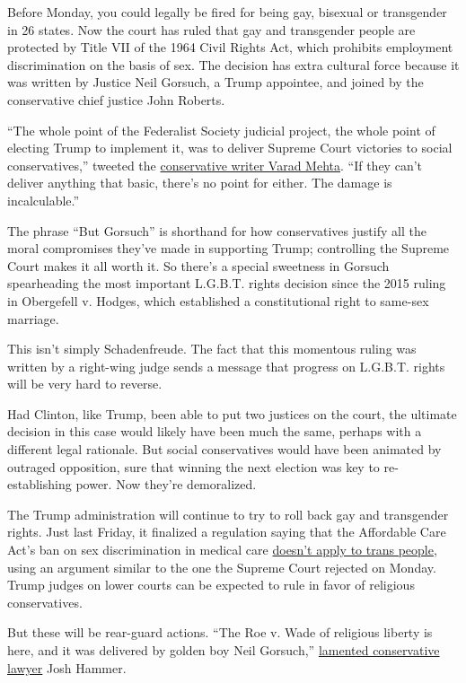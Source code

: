 Before Monday, you could legally be fired for being gay, bisexual or
transgender in 26 states. Now the court has ruled that gay and
transgender people are protected by Title VII of the 1964 Civil Rights
Act, which prohibits employment discrimination on the basis of sex. The
decision has extra cultural force because it was written by Justice Neil
Gorsuch, a Trump appointee, and joined by the conservative chief justice
John Roberts.

``The whole point of the Federalist Society judicial project, the whole
point of electing Trump to implement it, was to deliver Supreme Court
victories to social conservatives,'' tweeted the
\href{https://twitter.com/varadmehta/status/1272532015292862464?s=20}{conservative
writer Varad Mehta}. ``If they can't deliver anything that basic,
there's no point for either. The damage is incalculable.''

The phrase ``But Gorsuch'' is shorthand for how conservatives justify
all the moral compromises they've made in supporting Trump; controlling
the Supreme Court makes it all worth it. So there's a special sweetness
in Gorsuch spearheading the most important L.G.B.T. rights decision
since the 2015 ruling in Obergefell v. Hodges, which established a
constitutional right to same-sex marriage.

This isn't simply Schadenfreude. The fact that this momentous ruling was
written by a right-wing judge sends a message that progress on L.G.B.T.
rights will be very hard to reverse.

Had Clinton, like Trump, been able to put two justices on the court, the
ultimate decision in this case would likely have been much the same,
perhaps with a different legal rationale. But social conservatives would
have been animated by outraged opposition, sure that winning the next
election was key to re-establishing power. Now they're demoralized.

The Trump administration will continue to try to roll back gay and
transgender rights. Just last Friday, it finalized a regulation saying
that the Affordable Care Act's ban on sex discrimination in medical care
\href{https://www.nytimes3xbfgragh.onion/2020/06/12/us/politics/trump-transgender-rights.html}{doesn't
apply to trans people}, using an argument similar to the one the Supreme
Court rejected on Monday. Trump judges on lower courts can be expected
to rule in favor of religious conservatives.

But these will be rear-guard actions. ``The Roe v. Wade of religious
liberty is here, and it was delivered by golden boy Neil Gorsuch,''
\href{https://twitter.com/josh_hammer/status/1272532875204853761?s=20}{lamented
conservative lawyer} Josh Hammer.

